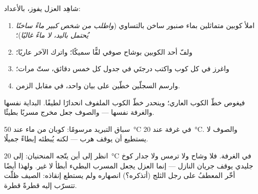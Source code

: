 \begin{method}\label{met:g5:heat-and-insulation:race}
شاهِد العزل يفوز، بالأعداد:
\begin{enumerate}
  \item املأ كوبين متماثلين بماء صنبور ساخن بالتساوي
        (\emph{واطلب من شخص كبير ماءً ساخنًا يُحتمل باليد، لا
        ماءً غاليًا})؛
  \item ولفّ أحد الكوبين بوشاح صوفي لفًّا سميكًا؛ واترك الآخر
        عاريًا؛
  \item واغرز  في كل كوب واكتب درجتَي  في
        جدول كل خمس دقائق، ستّ مرات؛
  \item وارسم السجلّين خطّين على بيان واحد،  في
        مقابل الزمن.
\end{enumerate}
فيغوص خطّ الكوب العاري؛ وينحدر خطّ الكوب الملفوف انحدارًا
لطيفًا. البداية نفسها والغرفة نفسها --- والصوف جعل مخرج 
مسربًا بطيئًا.
\end{method}

\begin{omfigure}

{\small سباق التبريد مرسومًا: كوبان من ماء عند \qty{50}{\celsius}
في غرفة عند \qty{20}{\celsius}. والصوف لا يستطيع أن يوقف هرب
 --- لكنه يُبطئه إبطاءً جميلًا.}
\end{omfigure}

\begin{remark}\label{rem:g5:heat-and-insulation:onlyslows}
انظر إلى أين يتّجه المنحنيان: إلى \qty{20}{\celsius} في الغرفة.
فلا وشاح ولا ترمس ولا جدار كوخ جليدي يوقف جريان  النازل
--- إنما العزل يجعل المسرب البطيء أبطأ لا غير. ولهذا أيضًا أخّر
المعطفُ على رجل الثلج (أتذكره؟) انصهاره ولم يستطع إنقاذه: 
الصيف ظلّت تتسرّب إليه قطرةً قطرة.
\end{remark}

